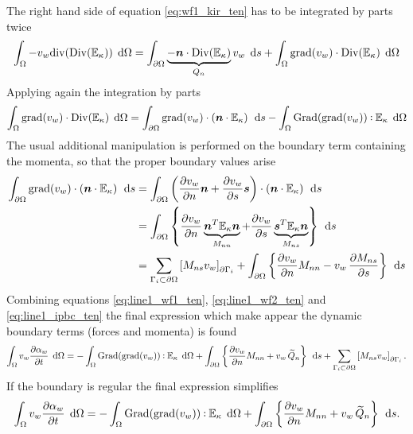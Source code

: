 \documentclass[preprint,12pt]{elsarticle}
\def\onedot{$\mathsurround0pt\ldotp$}
\def\cddot{%
	\mathbin{\vcenter{\baselineskip.67ex
			\hbox{\onedot}\hbox{\onedot}}%
}}
\begin{document}
	The right hand side of equation \eqref{eq:wf1_kir_ten} has to be integrated by parts twice
	\begin{equation}
	\label{eq:line1_wf1_ten}
	\int_{\Omega} - v_w \mathrm{div}(\mathrm{Div}(\mathbb{E}_{\kappa})) \, \d\Omega = \int_{\partial \Omega} \underbrace{- \bm{n} \cdot \mathrm{Div}(\mathbb{E}_{\kappa})}_{Q_n} v_w \, \d{s} + \int_{\Omega} \mathrm{grad}(v_w)  \cdot \mathrm{Div}(\mathbb{E}_{\kappa}) \, \d\Omega
	\end{equation}
	Applying again the integration by parts
	\begin{equation}
	\label{eq:line1_wf2_ten}
	\int_{\Omega} \mathrm{grad}(v_w)  \cdot \mathrm{Div}(\mathbb{E}_{\kappa}) \, \d\Omega = \int_{\partial \Omega} \mathrm{grad}(v_w)  \cdot \left( \bm{n} \cdot \mathbb{E}_{\kappa} \right) \, \d{s} -  \int_{\Omega}\mathrm{Grad}(\mathrm{grad}(v_w))  \cddot \mathbb{E}_{\kappa} \, \d\Omega
	\end{equation}
	The usual additional manipulation is performed on the boundary term containing the momenta, so that the proper boundary values arise
	\begin{equation}
	\label{eq:line1_ipbc_ten}
	\begin{aligned}
	\int_{\partial \Omega} \mathrm{grad}(v_w)  \cdot \left( \bm{n} \cdot \mathbb{E}_{\kappa} \right) \, \d{s} &= \int_{\partial \Omega} \left(\diffp{v_w}{n} \bm{n} + \diffp{v_w}{s} \bm{s} \right)  \cdot \left( \bm{n} \cdot \mathbb{E}_{\kappa} \right) \, \d{s} \\
	&= \int_{\partial \Omega} \left\{  \diffp{v_w}{n}  \underbrace{\bm{n}^T \mathbb{E}_{\kappa}\bm{n}}_{M_{nn}} +  \diffp{v_w}{s}  \underbrace{\bm{s}^T \mathbb{E}_{\kappa}\bm{n}}_{M_{ns}} \right\}  \, \d{s} \\
	&= \sum_{\Gamma_{i} \subset \partial \Omega} \left[ M_{ns} v_w \right]_{\partial \Gamma_i} + \int_{\partial \Omega} \left\{ \diffp{v_w}{n} M_{nn}  - v_w \, \diffp{M_{ns}}{s} \right\} \, \d{s}
	\end{aligned}
	\end{equation}
	Combining equations \eqref{eq:line1_wf1_ten}, \eqref{eq:line1_wf2_ten} and \eqref{eq:line1_ipbc_ten} the final expression which make appear the dynamic boundary terms (forces and momenta) is found 
	\begin{equation}
	\int_{\Omega} v_w \diffp{\alpha_w}{t} \, \d\Omega  =  -  \int_{\Omega} \mathrm{Grad}(\mathrm{grad}(v_w))  \cddot \mathbb{E}_{\kappa} \, \d\Omega  +  \int_{\partial \Omega} \left\{ \diffp{v_w}{n} M_{nn}  + v_w \, \widetilde{Q}_n \right\}  \, \d{s}  + \sum_{\Gamma_{i} \subset \partial \Omega} \left[ M_{ns} v_w \right]_{\partial \Gamma_i}.
	\end{equation}
	If the boundary is regular the final expression simplifies  
	\begin{equation}
	\int_{\Omega} v_w \diffp{\alpha_w}{t}  \, \d\Omega =  -  \int_{\Omega} \mathrm{Grad}(\mathrm{grad}(v_w))  \cddot \mathbb{E}_{\kappa} \, \d\Omega +  \int_{\partial \Omega} \left\{ \diffp{v_w}{n} M_{nn}  + v_w \, \widetilde{Q}_n \right\} \, \d{s}. 
	\end{equation}
	
\end{document}
